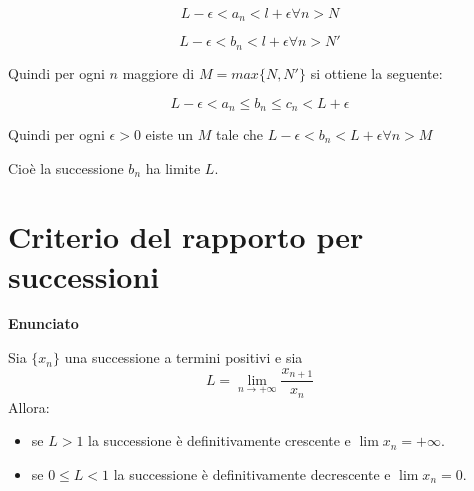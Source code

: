 $$L-\epsilon < a_{n} < l+\epsilon \forall n>N$$

$$L-\epsilon < b_{n} < l+\epsilon \forall n>N'$$

Quindi per ogni $n$ maggiore di $M=max\{N,N'\}$ si ottiene la seguente:

$$L-\epsilon < a_{n} \leq b_{n} \leq c_{n} < L+\epsilon$$

Quindi per ogni $\epsilon>0$ eiste un $M$ tale che $L-\epsilon < b_{n} < L+\epsilon \forall n>M$

Cioè la successione $b_{n}$ ha limite $L$.

\section{Criterio del rapporto per successioni}

\textbf{Enunciato}

Sia $\{x_n\}$ una successione a termini positivi e sia 
\begin{equation*}
L = \lim_{n \to +\infty} \frac{x_{n+1}}{x_n}
\end{equation*}
Allora:
\begin{itemize}
\item se $L > 1$ la successione è definitivamente crescente e $\lim x_n = +\infty$.
\item se $0 \le L < 1$ la successione è definitivamente decrescente e $\lim x_n = 0$.
\end{itemize}


